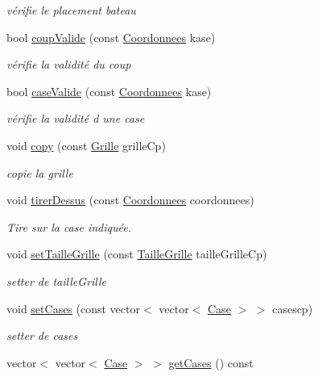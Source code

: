 \begin{DoxyCompactItemize}
\begin{DoxyCompactList}\small\item\em vérifie le placement bateau \end{DoxyCompactList}\item 
bool \hyperlink{classGrille_a89a1c6c280b45be14a037be5f24b290c}{coup\-Valide} (const \hyperlink{classCoordonnees}{Coordonnees} kase)
\begin{DoxyCompactList}\small\item\em vérifie la validité du coup \end{DoxyCompactList}\item 
bool \hyperlink{classGrille_a6e17e393ec162454199c3c91dd5c6904}{case\-Valide} (const \hyperlink{classCoordonnees}{Coordonnees} kase)
\begin{DoxyCompactList}\small\item\em vérifie la validité d une case \end{DoxyCompactList}\item 
void \hyperlink{classGrille_a57c832d829dfed5349cbedf8108f375c}{copy} (const \hyperlink{classGrille}{Grille} grille\-Cp)
\begin{DoxyCompactList}\small\item\em copie la grille \end{DoxyCompactList}\item 
void \hyperlink{classGrille_a87e7d232d399626e5a6ca582cc975205}{tirer\-Dessus} (const \hyperlink{classCoordonnees}{Coordonnees} coordonnees)
\begin{DoxyCompactList}\small\item\em Tire sur la case indiquée. \end{DoxyCompactList}\item 
void \hyperlink{classGrille_a45ab4bdd18513e38c389324da70a2bf7}{set\-Taille\-Grille} (const \hyperlink{classTailleGrille}{Taille\-Grille} taille\-Grille\-Cp)
\begin{DoxyCompactList}\small\item\em setter de taille\-Grille \end{DoxyCompactList}\item 
void \hyperlink{classGrille_a45f61eed4f4a3fe5ef2677a72bf43fbe}{set\-Cases} (const vector$<$ vector$<$ \hyperlink{classCase}{Case} $>$ $>$ casescp)
\begin{DoxyCompactList}\small\item\em setter de cases \end{DoxyCompactList}\item 
vector$<$ vector$<$ \hyperlink{classCase}{Case} $>$ $>$ \hyperlink{classGrille_a0702f9273c5704719522cb57b45e95e1}{get\-Cases} () const 

\end{DoxyCompactItemize}
